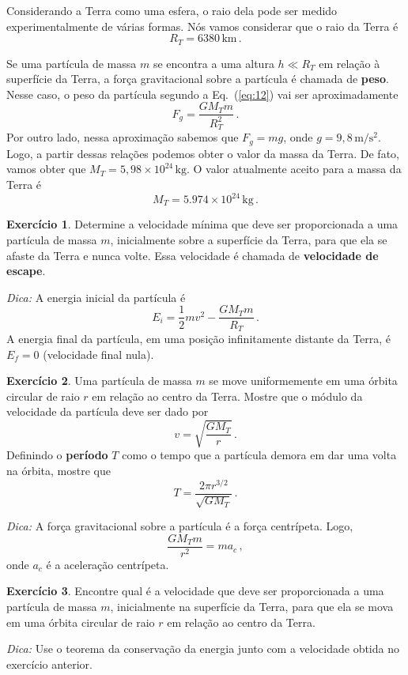 \documentclass[12pt,a4paper]{article}
\theoremstyle{definition}
\newtheorem{ex}{Exercício}[section]
\begin{document}
Considerando a Terra como uma esfera, o raio dela pode ser medido
experimentalmente de várias formas. Nós vamos considerar que o raio da
Terra é
$$R_T=6380\,\mathrm{km}\,.$$

Se uma partícula de massa $m$ se encontra a uma altura $h\ll R_T$ em
relação à superfície da Terra, a força gravitacional sobre a partícula
é chamada de \textbf{peso}. Nesse caso, o peso da partícula segundo a
Eq.~(\ref{eq:12}) vai ser aproximadamente
$$F_g=\frac{GM_Tm}{R_T^2}\,.$$
Por outro lado, nessa aproximação sabemos que $F_g=mg$, onde
$g=9{,}8\,\mathrm{m}/\mathrm{s}^2$. Logo, a partir dessas relações
podemos obter o valor da massa da Terra. De fato, vamos obter que
$M_T=5{,}98\times 10^{24}\,\mathrm{kg}$. O valor atualmente aceito
para a massa da Terra é
$$M_T=5.974\times 10^{24}\,\mathrm{kg}\,.$$

\begin{ex}
  Determine a velocidade mí\-ni\-ma que deve ser proporcionada a uma
  partícula de massa $m$, inicialmente sobre a superfície da Terra,
  para que ela se afaste da Terra e nunca volte. Essa velocidade é
  chamada de \textbf{velocidade de escape}.

  \noindent\textit{Dica:} A energia inicial da partícula é
  $$E_i=\frac{1}{2}mv^2-\frac{GM_Tm}{R_T}\,.$$
  A energia final da partícula, em uma posição infinitamente distante
  da Terra, é $E_f=0$ (velocidade final nula).
\end{ex}

\begin{ex}
  Uma partícula de massa $m$ se move uniformemente em uma órbita
  circular de raio $r$ em relação ao centro da Terra. Mostre que o
  módulo da velocidade da partícula deve ser dado por
  $$v=\sqrt{\frac{GM_T}{r}}\,.$$
  Definindo o \textbf{período} $T$ como o tempo que a partícula demora
  em dar uma volta na órbita, mostre que
  $$T=\frac{2\pi r^{3/2}}{\sqrt{GM_T}}\,.$$

  \noindent\textit{Dica:} A força gravitacional sobre a partícula é a
  força centrípeta. Logo,
  $$\frac{GM_Tm}{r^2}=ma_c\,,$$
  onde $a_c$ é a aceleração centrípeta.
\end{ex}

\begin{ex}
  Encontre qual é a velocidade que deve ser proporcionada a uma
  partícula de massa $m$, inicialmente na superfície da Terra, para
  que ela se mova em uma órbita circular de raio $r$ em relação ao
  centro da Terra.

  \noindent\textit{Dica:} Use o teorema da conservação da energia
  junto com a velocidade obtida no exercício anterior.
\end{ex}
\end{document}
